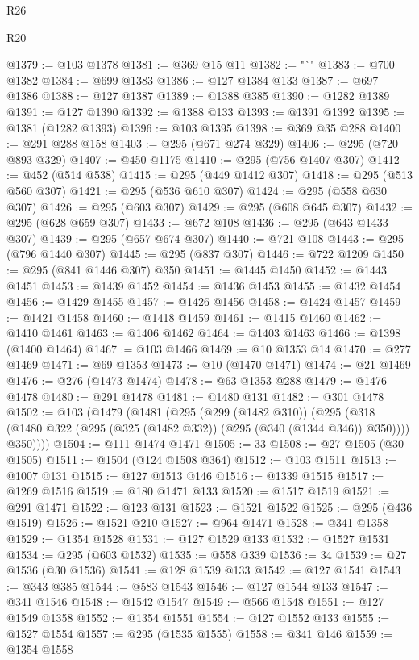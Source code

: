 \begin{lexlean}{R26}
\begin{lexlean}{R20}
\begin{coremodule}
{{{{{{{{{{{{{{{{{{{{{{{{{{{{{{{{{{{{{{{{{{{{{{{{{{{{{{{{{{{{{{{@1379 := @103 @1378
@1381 := @369 @15 @11
@1382 := "`"
@1383 := @700 @1382
@1384 := @699 @1383
@1386 := @127 @1384 @133
@1387 := @697 @1386
@1388 := @127 @1387
@1389 := @1388 @385
@1390 := @1282 @1389
@1391 := @127 @1390
@1392 := @1388 @133
@1393 := @1391 @1392
@1395 := @1381 (@1282 @1393)
@1396 := @103 @1395
@1398 := @369 @35 @288
@1400 := @291 @288 @158
@1403 := @295 (@671 @274 @329)
@1406 := @295 (@720 @893 @329)
@1407 := @450 @1175
@1410 := @295 (@756 @1407 @307)
@1412 := @452 (@514 @538)
@1415 := @295 (@449 @1412 @307)
@1418 := @295 (@513 @560 @307)
@1421 := @295 (@536 @610 @307)
@1424 := @295 (@558 @630 @307)
@1426 := @295 (@603 @307)
@1429 := @295 (@608 @645 @307)
@1432 := @295 (@628 @659 @307)
@1433 := @672 @108
@1436 := @295 (@643 @1433 @307)
@1439 := @295 (@657 @674 @307)
@1440 := @721 @108
@1443 := @295 (@796 @1440 @307)
@1445 := @295 (@837 @307)
@1446 := @722 @1209
@1450 := @295 (@841 @1446 @307) @350
@1451 := @1445 @1450
@1452 := @1443 @1451
@1453 := @1439 @1452
@1454 := @1436 @1453
@1455 := @1432 @1454
@1456 := @1429 @1455
@1457 := @1426 @1456
@1458 := @1424 @1457
@1459 := @1421 @1458
@1460 := @1418 @1459
@1461 := @1415 @1460
@1462 := @1410 @1461
@1463 := @1406 @1462
@1464 := @1403 @1463
@1466 := @1398 (@1400 @1464)
@1467 := @103 @1466
@1469 := @10 @1353 @14
@1470 := @277 @1469
@1471 := @69 @1353
@1473 := @10 (@1470 @1471)
@1474 := @21 @1469
@1476 := @276 (@1473 @1474)
@1478 := @63 @1353 @288
@1479 := @1476 @1478
@1480 := @291 @1478
@1481 := @1480 @131
@1482 := @301 @1478
@1502 := @103
    (@1479
      (@1481
        (@295
          (@299 (@1482 @310))
          (@295
            (@318 (@1480 @322 (@295 (@325 (@1482 @332)) (@295 (@340 (@1344 @346)) @350))))
            @350))))
@1504 := @111 @1474 @1471
@1505 := 33
@1508 := @27 @1505 (@30 @1505)
@1511 := @1504 (@124 @1508 @364)
@1512 := @103 @1511
@1513 := @1007 @131
@1515 := @127 @1513 @146
@1516 := @1339 @1515
@1517 := @1269 @1516
@1519 := @180 @1471 @133
@1520 := @1517 @1519
@1521 := @291 @1471
@1522 := @123 @131
@1523 := @1521 @1522
@1525 := @295 (@436 @1519)
@1526 := @1521 @210
@1527 := @964 @1471
@1528 := @341 @1358
@1529 := @1354 @1528
@1531 := @127 @1529 @133
@1532 := @1527 @1531
@1534 := @295 (@603 @1532)
@1535 := @558 @339
@1536 := 34
@1539 := @27 @1536 (@30 @1536)
@1541 := @128 @1539 @133
@1542 := @127 @1541
@1543 := @343 @385
@1544 := @583 @1543
@1546 := @127 @1544 @133
@1547 := @341 @1546
@1548 := @1542 @1547
@1549 := @566 @1548
@1551 := @127 @1549 @1358
@1552 := @1354 @1551
@1554 := @127 @1552 @133
@1555 := @1527 @1554
@1557 := @295 (@1535 @1555)
@1558 := @341 @146
@1559 := @1354 @1558
}}}}}}}}}}}}}}}}}}}}}}}}}}}}}}}}}}}}}}}}}}}}}}}}}}}}}}}}}}}}}}}
\end{coremodule}
\end{lexlean}
\end{lexlean}
